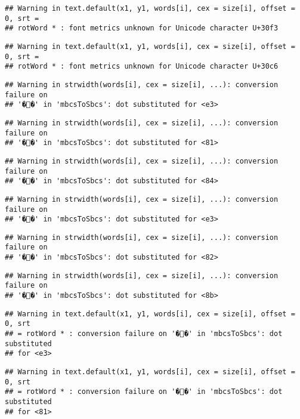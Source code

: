 \documentclass[]{article}
\begin{document}
\begin{verbatim}
## Warning in text.default(x1, y1, words[i], cex = size[i], offset = 0, srt =
## rotWord * : font metrics unknown for Unicode character U+30f3
\end{verbatim}

\begin{verbatim}
## Warning in text.default(x1, y1, words[i], cex = size[i], offset = 0, srt =
## rotWord * : font metrics unknown for Unicode character U+30c6
\end{verbatim}

\begin{verbatim}
## Warning in strwidth(words[i], cex = size[i], ...): conversion failure on
## '��' in 'mbcsToSbcs': dot substituted for <e3>
\end{verbatim}

\begin{verbatim}
## Warning in strwidth(words[i], cex = size[i], ...): conversion failure on
## '��' in 'mbcsToSbcs': dot substituted for <81>
\end{verbatim}

\begin{verbatim}
## Warning in strwidth(words[i], cex = size[i], ...): conversion failure on
## '��' in 'mbcsToSbcs': dot substituted for <84>
\end{verbatim}

\begin{verbatim}
## Warning in strwidth(words[i], cex = size[i], ...): conversion failure on
## '��' in 'mbcsToSbcs': dot substituted for <e3>
\end{verbatim}

\begin{verbatim}
## Warning in strwidth(words[i], cex = size[i], ...): conversion failure on
## '��' in 'mbcsToSbcs': dot substituted for <82>
\end{verbatim}

\begin{verbatim}
## Warning in strwidth(words[i], cex = size[i], ...): conversion failure on
## '��' in 'mbcsToSbcs': dot substituted for <8b>
\end{verbatim}

\begin{verbatim}
## Warning in text.default(x1, y1, words[i], cex = size[i], offset = 0, srt
## = rotWord * : conversion failure on '��' in 'mbcsToSbcs': dot substituted
## for <e3>
\end{verbatim}

\begin{verbatim}
## Warning in text.default(x1, y1, words[i], cex = size[i], offset = 0, srt
## = rotWord * : conversion failure on '��' in 'mbcsToSbcs': dot substituted
## for <81>
\end{verbatim}
\end{document}
